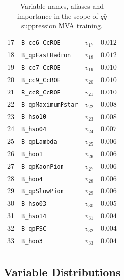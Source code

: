 \begin{longtable}{c|l|c|l}
17 &\texttt{\footnotesize B\_cc6\_CcROE} & $v_{17}$ & $0.012$ \\ 
18 &\texttt{\footnotesize B\_qpFastHadron} & $v_{18}$ & $0.012$ \\ 
19 &\texttt{\footnotesize B\_cc7\_CcROE} & $v_{19}$ & $0.010$ \\ 
20 &\texttt{\footnotesize B\_cc9\_CcROE} & $v_{20}$ & $0.010$ \\ 
21 &\texttt{\footnotesize B\_cc8\_CcROE} & $v_{21}$ & $0.010$ \\ 
22 &\texttt{\footnotesize B\_qpMaximumPstar} & $v_{22}$ & $0.008$ \\ 
23 &\texttt{\footnotesize B\_hso10} & $v_{23}$ & $0.008$ \\ 
24 &\texttt{\footnotesize B\_hso04} & $v_{24}$ & $0.007$ \\ 
25 &\texttt{\footnotesize B\_qpLambda} & $v_{25}$ & $0.006$ \\ 
26 &\texttt{\footnotesize B\_hoo1} & $v_{26}$ & $0.006$ \\ 
27 &\texttt{\footnotesize B\_qpKaonPion} & $v_{27}$ & $0.006$ \\ 
28 &\texttt{\footnotesize B\_hoo4} & $v_{28}$ & $0.006$ \\ 
29 &\texttt{\footnotesize B\_qpSlowPion} & $v_{29}$ & $0.006$ \\ 
30 &\texttt{\footnotesize B\_hso03} & $v_{30}$ & $0.005$ \\ 
31 &\texttt{\footnotesize B\_hso14} & $v_{31}$ & $0.004$ \\ 
32 &\texttt{\footnotesize B\_qpFSC} & $v_{32}$ & $0.004$ \\ 
33 &\texttt{\footnotesize B\_hoo3} & $v_{33}$ & $0.004$ \\
\bottomrule 
\captionsetup{width=0.8\linewidth}
\caption{Variable names, aliases and importance in the scope of $q\bar q$ suppression MVA training.}
\end{longtable}

\subsection{Variable Distributions}

